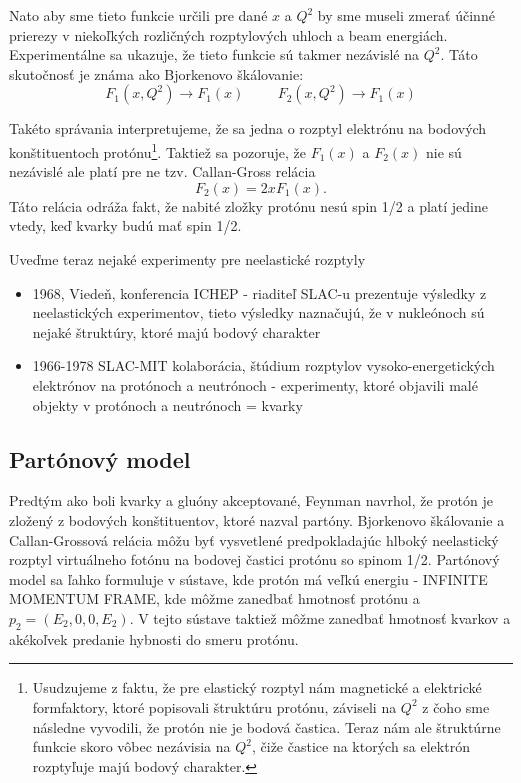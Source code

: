 \documentclass[../../main.tex]{subfiles}
\begin{document}
Nato aby sme tieto funkcie určili pre dané $x$ a $Q^2$ by sme museli zmerať účinné prierezy v niekoľkých rozličných rozptylových uhloch a beam energiách. Experimentálne sa ukazuje, že tieto funkcie sú takmer nezávislé na $Q^2$. Táto skutočnosť je známa ako Bjorkenovo škálovanie:
$$ F_1(x,Q^2) \rightarrow F_1(x) \hspace{1cm} F_2(x,Q^2) \rightarrow F_1(x) $$

Takéto správania interpretujeme, že sa jedna o rozptyl elektrónu na bodových konštituentoch protónu\footnote{Usudzujeme z faktu, že pre elastický rozptyl nám magnetické a elektrické formfaktory, ktoré popisovali štruktúru protónu, záviseli na $Q^2$ z čoho sme následne vyvodili, že protón nie je bodová častica. Teraz nám ale štruktúrne funkcie skoro vôbec nezávisia na $Q^2$, čiže častice na ktorých sa elektrón rozptyľuje majú bodový charakter.}. Taktiež sa pozoruje, že $F_1(x)$ a $F_2(x)$ nie sú nezávislé ale platí pre ne tzv. Callan-Gross relácia
$$ F_2(x) = 2xF_1(x).$$
Táto relácia odráža fakt, že nabité zložky protónu nesú spin 1/2 a platí jedine vtedy, keď kvarky budú mať spin 1/2.

Uveďme teraz nejaké experimenty pre neelastické rozptyly
\begin{itemize}
\item 1968, Viedeň, konferencia ICHEP - riaditeľ SLAC-u prezentuje výsledky z neelastických experimentov, tieto výsledky naznačujú, že v nukleónoch sú nejaké štruktúry, ktoré majú bodový charakter
\item 1966-1978 SLAC-MIT kolaborácia, štúdium rozptylov vysoko-energetických elektrónov na protónoch a neutrónoch - experimenty, ktoré objavili malé objekty v protónoch a neutrónoch = kvarky
\end{itemize}

\subsection{Partónový model}
Predtým ako boli kvarky a gluóny akceptované, Feynman navrhol, že protón je zložený z bodových konštituentov, ktoré nazval partóny. Bjorkenovo škálovanie a Callan-Grossová relácia môžu byť vysvetlené predpokladajúc hlboký neelastický rozptyl virtuálneho fotónu na bodovej častici protónu so spinom 1/2. Partónový model sa ľahko formuluje v sústave, kde protón má veľkú energiu - INFINITE MOMENTUM FRAME, kde môžme zanedbať hmotnosť protónu a $p_2=(E_2,0,0,E_2)$. V tejto sústave taktiež môžme zanedbať hmotnosť kvarkov a akékoľvek predanie hybnosti do smeru protónu.
\end{document}
